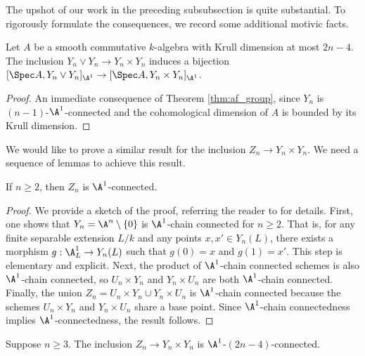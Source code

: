 The upshot of our work in the preceding subsubsection is quite substantial. To rigorously formulate the consequences, we record some additional motivic facts. 

\begin{lemma}\label{lem:easy}
    Let $A$ be a smooth commutative $k$-algebra with Krull dimension at most $2n-4$. The inclusion $Y_n \vee Y_n \to Y_n \times Y_n$ induces a bijection $[\Spec A, Y_n \vee Y_n]_{\A^1} \to [\Spec A, Y_n \times Y_n]_{\A^1}$. 
\end{lemma}

\begin{proof}
    An immediate consequence of Theorem \ref{thm:af_group}, since $Y_n$ is $(n-1)$-$\A^1$-connected and the cohomological dimension of $A$ is bounded by its Krull dimension.
\end{proof}

We would like to prove a similar result for the inclusion $Z_n \to Y_n \times Y_n$. We need a sequence of lemmas to achieve this result.

\begin{lemma}\cite[Lemma 4.5]{LERBET2024109415}
    If $n \geq 2$, then $Z_n$ is $\A^1$-connected. 
\end{lemma}

\begin{proof}
    We provide a sketch of the proof, referring the reader to \cite[Lemma 5.5]{LERBET2024109415} for details. First, one shows that $Y_n = \A^n \setminus \{0\}$ is $\A^1$-chain connected for $n \geq 2$. That is, for any finite separable extension $L/k$ and any points $x,x' \in Y_n(L)$, there exists a morphism $g: \A^1_L \to Y_n(L)$ such that $g(0) = x$ and $g(1) = x'$. This step is elementary and explicit. Next, the product of $\A^1$-chain connected schemes is also $\A^1$-chain connected, so $U_n \times Y_n$ and $Y_n \times U_n$ are both $\A^1$-chain connected. Finally, the union $Z_n = U_n \times Y_n \cup Y_n \times U_n$ is $\A^1$-chain connected because the schemes $U_n \times Y_n$ and $Y_n \times U_n$ share a base point. Since $\A^1$-chain connectedness implies $\A^1$-connectedness, the result follows.
\end{proof}

\begin{lemma}\cite[Lemma 5.6]{LERBET2024109415}
    Suppose $n \geq 3$. The inclusion $Z_n \to Y_n \times Y_n$ is $\A^1$-$(2n-4)$-connected.
\end{lemma}

